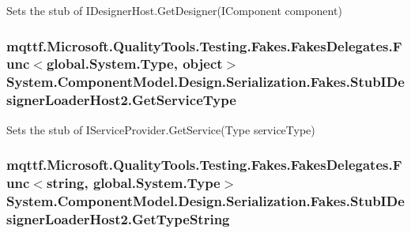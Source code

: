 Sets the stub of I\-Designer\-Host.\-Get\-Designer(\-I\-Component component)

\hypertarget{class_system_1_1_component_model_1_1_design_1_1_serialization_1_1_fakes_1_1_stub_i_designer_loader_host2_ab7c8a897e4fcb11b226cef32fa7e1d4c}{
\subsubsection[{Get\-Service\-Type}]{\setlength{\rightskip}{0pt plus 5cm}mqttf.\-Microsoft.\-Quality\-Tools.\-Testing.\-Fakes.\-Fakes\-Delegates.\-Func$<$global.\-System.\-Type, object$>$ System.\-Component\-Model.\-Design.\-Serialization.\-Fakes.\-Stub\-I\-Designer\-Loader\-Host2.\-Get\-Service\-Type}}\label{class_system_1_1_component_model_1_1_design_1_1_serialization_1_1_fakes_1_1_stub_i_designer_loader_host2_ab7c8a897e4fcb11b226cef32fa7e1d4c}


Sets the stub of I\-Service\-Provider.\-Get\-Service(\-Type service\-Type)

\hypertarget{class_system_1_1_component_model_1_1_design_1_1_serialization_1_1_fakes_1_1_stub_i_designer_loader_host2_ac48f5dd5f90c92bcfd0bb41387c31df7}{
\subsubsection[{Get\-Type\-String}]{\setlength{\rightskip}{0pt plus 5cm}mqttf.\-Microsoft.\-Quality\-Tools.\-Testing.\-Fakes.\-Fakes\-Delegates.\-Func$<$string, global.\-System.\-Type$>$ System.\-Component\-Model.\-Design.\-Serialization.\-Fakes.\-Stub\-I\-Designer\-Loader\-Host2.\-Get\-Type\-String}}\label{class_system_1_1_component_model_1_1_design_1_1_serialization_1_1_fakes_1_1_stub_i_designer_loader_host2_ac48f5dd5f90c92bcfd0bb41387c31df7}


